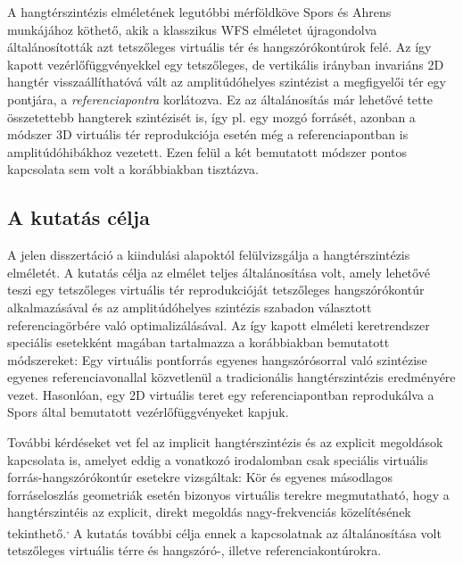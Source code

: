 \documentclass[10pt,twoside]{article}
\theoremstyle{thesisgroupstyle}
\theoremstyle{indented}
\begin{document}
A hangtérszintézis elméletének legutóbbi mérföldköve Spors és Ahrens munkájához köthető, akik a klasszikus WFS elméletet újragondolva általánosították azt tetszőleges virtuális tér és hangszórókontúrok felé.
Az így kapott vezérlőfüggvényekkel egy tetszőleges, de vertikális irányban invariáns 2D hangtér visszaállíthatóvá vált az amplitúdóhelyes szintézist a megfigyelői tér egy pontjára, a \emph{referenciapontra} korlátozva.
Ez az általánosítás már lehetővé tette összetettebb hangterek szintézisét is, így pl. egy mozgó forrásét, azonban a módszer  3D virtuális tér reprodukciója esetén még a referenciapontban is amplitúdóhibákhoz vezetett.
Ezen felül a két bemutatott módszer pontos kapcsolata sem volt a korábbiakban tisztázva.

\subsection{A kutatás célja}

A jelen disszertáció a kiindulási alapoktól felülvizsgálja a hangtérszintézis elméletét. 
A kutatás célja az elmélet teljes általánosítása volt, amely lehetővé teszi egy tetszőleges virtuális tér reprodukcióját tetszőleges hangszórókontúr alkalmazásával és az amplitúdóhelyes szintézis szabadon választott referenciagörbére való optimalizálásával.
Az így kapott elméleti keretrendszer speciális esetekként magában tartalmazza a korábbiakban bemutatott módszereket: 
Egy virtuális pontforrás egyenes hangszórósorral való szintézise egyenes referenciavonallal közvetlenül a tradicionális hangtérszintézis eredményére vezet.
Hasonlóan, egy 2D virtuális teret egy referenciapontban reprodukálva a Spors által bemutatott vezérlőfüggvényeket kapjuk. 

További kérdéseket vet fel az implicit hangtérszintézis és az explicit megoldások kapcsolata is, amelyet eddig a vonatkozó irodalomban csak speciális virtuális forrás-hangszórókontúr esetekre vizsgáltak:
Kör és egyenes másodlagos forráseloszlás geometriák esetén bizonyos virtuális terekre megmutatható, hogy a hangtérszintéis az explicit, direkt megoldás nagy-frekvenciás közelítésének tekinthető.\textsuperscript{,}
A kutatás további célja ennek a kapcsolatnak az általánosítása volt tetszőleges virtuális térre és hangszóró-, illetve referenciakontúrokra.
\end{document}
